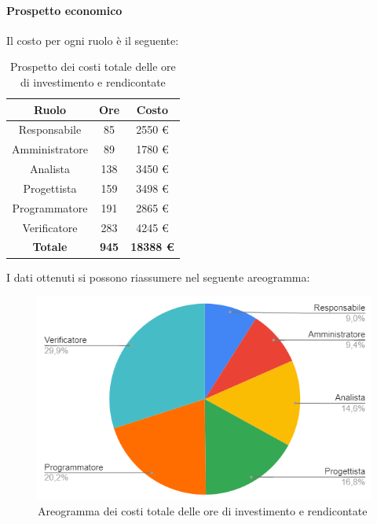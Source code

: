 \paragraph{Prospetto economico}
Il costo per ogni ruolo è il seguente:
\begin{table}[H]
		\begin{center}
			\setlength{\aboverulesep}{0pt}
			\setlength{\belowrulesep}{0pt}
			\setlength{\extrarowheight}{.75ex}
			\begin{tabular}{ c c c }
				\rowcolor{AzzurroGruppo!30} 
				\textbf{Ruolo} & \textbf{Ore} & \textbf{Costo}  \\
				\toprule
				Responsabile   & 85 & 2550 \euro \\
				Amministratore & 89 & 1780 \euro \\
				Analista       & 138 & 3450 \euro \\
				Progettista    & 159 & 3498 \euro \\
				Programmatore  & 191 & 2865 \euro \\
				Verificatore   & 283 & 4245 \euro \\
				\textbf{Totale} & \textbf{945} & \textbf{18388 \euro} \\
				\bottomrule
			\end{tabular}
			\caption{ Prospetto dei costi totale delle ore di investimento e rendicontate}
		\end{center}
	\end{table}
I dati ottenuti si possono riassumere nel seguente areogramma:
\begin{figure}[H]
    \centering
    \includegraphics[scale = 0.5]{components/img/tot_torta.png}
    \caption{ Areogramma dei costi totale delle ore di investimento e rendicontate}
    \label{fig:areogramma ripartizione ore totali di investimento e rendicontate}
\end{figure}
